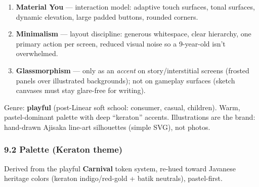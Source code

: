 \documentclass[
  11pt,
]{article}
\providecommand{\tightlist}{%
  \setlength{\itemsep}{0pt}\setlength{\parskip}{0pt}}
\begin{document}
\begin{enumerate}
\def\labelenumi{\arabic{enumi}.}
\tightlist
\item
  \textbf{Material You} --- interaction model: adaptive touch surfaces,
  tonal surfaces, dynamic elevation, large padded buttons, rounded
  corners.
\item
  \textbf{Minimalism} --- layout discipline: generous whitespace, clear
  hierarchy, one primary action per screen, reduced visual noise so a
  9-year-old isn't overwhelmed.
\item
  \textbf{Glassmorphism} --- only as an \emph{accent} on
  story/interstitial screens (frosted panels over illustrated
  backgrounds); not on gameplay surfaces (sketch canvases must stay
  glare-free for writing).
\end{enumerate}

Genre: \textbf{playful} (post-Linear soft school: consumer, casual,
children). Warm, pastel-dominant palette with deep ``keraton'' accents.
Illustrations are the brand: hand-drawn Ajisaka line-art silhouettes
(simple SVG), not photos.

\subsubsection{9.2 Palette (Keraton theme)}\label{palette-keraton-theme}

Derived from the playful \textbf{Carnival} token system, re-hued toward
Javanese heritage colors (keraton indigo/red-gold + batik neutrals),
pastel-first.
\end{document}
